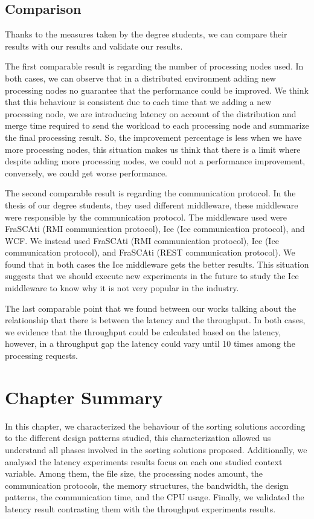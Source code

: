 \subsection{Comparison}

Thanks to the measures taken by the degree students, we can compare their results with our results and validate our results.

The first comparable result is regarding the number of processing nodes used. In both cases, we can observe that in a distributed environment adding new processing nodes no guarantee that the performance could be improved. We think that this behaviour is consistent due to each time that we adding a new processing node, we are introducing latency on account of the distribution and merge time required to send the workload to each processing node and summarize the final processing result. So, the improvement percentage is less when we have more processing nodes, this situation makes us think that there is a limit where despite adding more processing nodes, we could not a performance improvement, conversely, we could get worse performance.

The second comparable result is regarding the communication protocol. In the thesis of our degree students, they used different middleware, these middleware were responsible by the communication protocol. The middleware used were FraSCAti (RMI communication protocol), Ice (Ice communication protocol), and WCF. We instead used FraSCAti (RMI communication protocol), Ice (Ice communication protocol), and FraSCAti (REST communication protocol). We found that in both cases the Ice middleware gets the better results. This situation suggests that we should execute new experiments in the future to study the Ice middleware to know why it is not very popular in the industry.

The last comparable point that we found between our works talking about the relationship that there is between the latency and the throughput. In both cases, we evidence that the throughput could be calculated based on the latency, however, in a throughput gap the latency could vary until 10 times among the processing requests.


\section{Chapter Summary}
In this chapter, we characterized the behaviour of the sorting solutions according to the different design patterns studied, this characterization allowed us understand all phases involved in the sorting solutions proposed. Additionally, we analysed the latency experiments results focus on each one studied context variable. Among them, the file size, the processing nodes amount, the communication protocols, the memory structures, the bandwidth, the design patterns, the communication time, and the CPU usage. Finally, we validated the latency result contrasting them with the throughput experiments results.